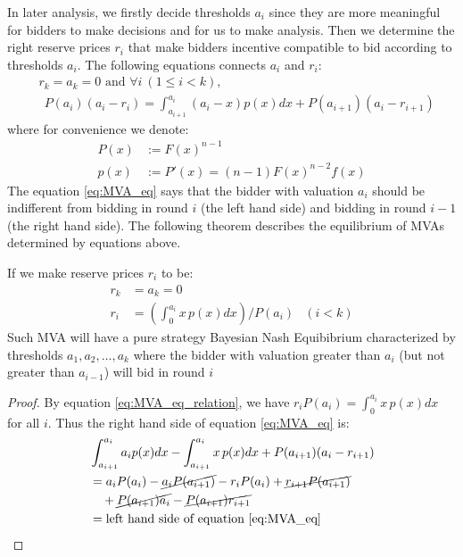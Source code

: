 In later analysis, we firstly decide thresholds $a_i$ since they are more
meaningful for bidders to make decisions and for us to make analysis. Then we
determine the right reserve prices $r_i$ that make bidders incentive compatible
to bid according to thresholds $a_i$. The following equations connects $a_i$
and $r_i$:
\begin{align}\label{eq:MVA_eq}
    &r_k = a_k = 0 \mbox{ and }
    \forall i ~(1 \leq i < k),\nonumber\\
    &~~P(a_{i})(a_{i}-r_i) =
    \int_{a_{i+1}}^{a_{i}}(a_{i}-x)p(x)dx+P(a_{i+1})(a_{i}-r_{i+1})
\end{align}
where for convenience we denote:
\begin{align*}
    P(x) &:= F(x)^{n-1}\\
    p(x) &:= P'(x) = (n-1)F(x)^{n-2} f(x)
\end{align*}
The equation \ref{eq:MVA_eq} says that the bidder with valuation $a_i$ should be
indifferent from bidding in round $i$ (the left hand side) and bidding in round
$i-1$(the right hand side).  The following theorem describes the equilibrium of
MVAs determined by equations above.

\begin{theorem}
If we make reserve prices $r_i$ to be:
\begin{align}\label{eq:MVA_eq_relation}
  r_k &= a_k = 0 \nonumber \\
  r_i &= \left( \int_{0}^{a_i} x \, p(x) dx \right) / P(a_i) & (i < k)
\end{align}
Such MVA will have a pure strategy Bayesian Nash Equibibrium characterized by
thresholds $a_1, a_2, \ldots, a_k$ where the bidder with valuation greater than
$a_i$ (but not greater than $a_{i-1}$) will bid in round $i$
\end{theorem}

\begin{proof}
By equation \ref{eq:MVA_eq_relation}, we have $r_i P(a_i) = \int_{0}^{a_i}
x\,p(x)dx$ for all $i$. Thus the right
hand side of equation \ref{eq:MVA_eq} is:
\begin{align*}
	& \int_{a_{i+1}}^{a_i} a_i p(x) dx - \int_{a_{i+1}}^{a_i} x \, p(x) dx + P(a_{i+1})(a_i-r_{i+1}) \\
	&= a_i P(a_i) - \cancel{a_i P(a_{i+1})} - r_i P(a_i) + \cancel{r_{i+1} P(a_{i+1})} \\
		& ~~~ + \cancel{P(a_{i+1}) a_i} - \cancel{P(a_{i+1}) r_{i+1}}\\
	&= \mbox{left hand side of equation \ref{eq:MVA_eq}}
\end{align*}
\end{proof}

